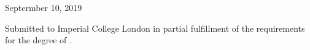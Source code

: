 \begin{titlepage}



{\large Septermber 10, 2019} %


\vfill %
Submitted to Imperial College London in partial fulfillment of the requirements for the degree of \degreetype.

\end{titlepage}
